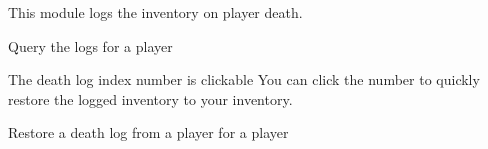 
This module logs the inventory on player death.


\begin{example}{Query the logs for a player}

    \begin{tips}{The death log index number is clickable}
        You can click the number to quickly restore the logged inventory to your inventory.
    \end{tips}
\end{example}

\begin{example}{Restore a death log from a player for a player}
\end{example}
